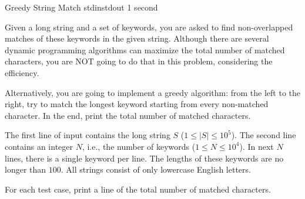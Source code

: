 \begin{problem}{Greedy String Match}
{stdin}{stdout}
{1 second}{}{}

Given a long string and a set of keywords, you are asked to find non-overlapped matches of these keywords in the given string.
Although there are several dynamic programming algorithms can maximize the total number of matched characters, you are NOT going to do that in this problem, considering the efficiency.

Alternatively, you are going to implement a greedy algorithm: from the left to the right, try to match the longest keyword starting from every non-matched character.
In the end, print the total number of matched characters.

\InputFile

The first line of input contains the long string $S$ ($1 \le |S| \le 10^5$).
The second line contains an integer $N$, i.e., the number of keywords ($1 \le N \le 10^4$).
In next $N$ lines, there is a single keyword per line. 
The lengths of these keywords are no longer than $100$.
All strings consist of only lowercase English letters.

\OutputFile

For each test case, print a line of the total number of matched characters.

\Examples

\begin{example}
%
%
\end{example}

\end{problem}
